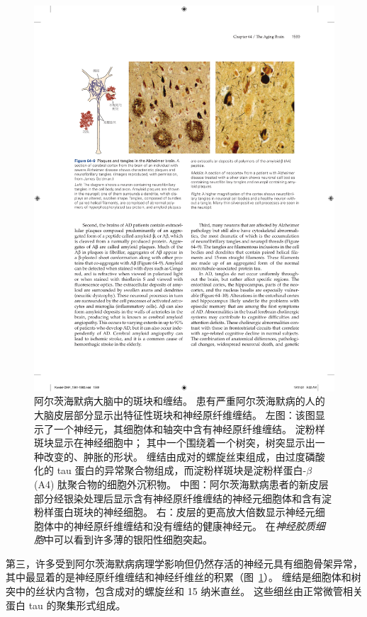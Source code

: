 \begin{figure}[htbp]
	\centering
	\includegraphics[width=1.0\linewidth]{chap64/fig_64_9}
	\caption{阿尔茨海默病大脑中的斑块和缠结。
		患有严重阿尔茨海默病的人的大脑皮层部分显示出特征性斑块和神经原纤维缠结。
		左图：该图显示了一个神经元，其细胞体和轴突中含有神经原纤维缠结。
		淀粉样斑块显示在神经细胞中；
		其中一个围绕着一个树突，树突显示出一种改变的、肿胀的形状。
		缠结由成对的螺旋丝束组成，由过度磷酸化的 tau 蛋白的异常聚合物组成，而淀粉样斑块是淀粉样蛋白-$\beta$ (A4) 肽聚合物的细胞外沉积物。
		中图：阿尔茨海默病患者的新皮层部分经银染处理后显示含有神经原纤维缠结的神经元细胞体和含有淀粉样蛋白斑块的神经细胞。
		右：皮层的更高放大倍数显示神经元细胞体中的神经原纤维缠结和没有缠结的健康神经元。
		在\textit{神经胶质细胞}中可以看到许多薄的银阳性细胞突起。}
	\label{fig:64_9}
\end{figure}


第三，许多受到阿尔茨海默病病理学影响但仍然存活的神经元具有细胞骨架异常，其中最显着的是神经原纤维缠结和神经纤维丝的积累（图~\ref{fig:64_9}）。
缠结是细胞体和树突中的丝状内含物，包含成对的螺旋丝和 15 纳米直丝。
这些细丝由正常微管相关蛋白 tau 的聚集形式组成。


